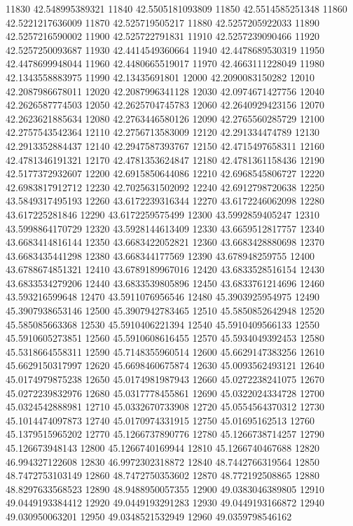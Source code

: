 {11830 42.548995389321
11840 42.5505181093809
11850 42.5514585251348
11860 42.5221217636009
11870 42.525719505217
11880 42.5257205922033
11890 42.5257216590002
11900 42.525722791831
11910 42.5257239090466
11920 42.5257250093687
11930 42.4414549360664
11940 42.4478689530319
11950 42.4478699948044
11960 42.4480665519017
11970 42.4663111228049
11980 42.1343558883975
11990 42.13435691801
12000 42.2090083150282
12010 42.2087986678011
12020 42.2087996341128
12030 42.0974671427756
12040 42.2626587774503
12050 42.2625704745783
12060 42.2640929423156
12070 42.2623621885634
12080 42.2763446580126
12090 42.2765560285729
12100 42.2757543542364
12110 42.2756713583009
12120 42.291334474789
12130 42.2913352884437
12140 42.2947587393767
12150 42.4715497658311
12160 42.4781346191321
12170 42.4781353624847
12180 42.4781361158436
12190 42.5177372932607
12200 42.6915850644086
12210 42.6968545806727
12220 42.6983817912712
12230 42.7025631502092
12240 42.6912798720638
12250 43.5849317495193
12260 43.6172239316344
12270 43.6172246062098
12280 43.617225281846
12290 43.6172259575499
12300 43.5992859405247
12310 43.5998864170729
12320 43.5928144613409
12330 43.6659512817757
12340 43.6683414816144
12350 43.6683422052821
12360 43.6683428880698
12370 43.6683435441298
12380 43.668344177569
12390 43.678948259755
12400 43.6788674851321
12410 43.6789189967016
12420 43.6833528516154
12430 43.6833534279206
12440 43.6833539805896
12450 43.6833761214696
12460 43.593216599648
12470 43.5911076956546
12480 45.3903925954975
12490 45.3907938653146
12500 45.3907942783465
12510 45.5850852642948
12520 45.585085663368
12530 45.5910406221394
12540 45.5910409566133
12550 45.5910605273851
12560 45.5910608616455
12570 45.5934049392453
12580 45.5318664558311
12590 45.7148355960514
12600 45.6629147383256
12610 45.6629150317997
12620 45.6698460675874
12630 45.0093562493121
12640 45.0174979875238
12650 45.0174981987943
12660 45.0272238241075
12670 45.0272239832976
12680 45.0317778455861
12690 45.0322024334728
12700 45.0324542888981
12710 45.0332670733908
12720 45.0554564370312
12730 45.1014474097873
12740 45.0170974331915
12750 45.01695162513
12760 45.1379515965202
12770 45.1266737890776
12780 45.1266738714257
12790 45.126673948143
12800 45.1266740169944
12810 45.1266740467688
12820 46.994327122608
12830 46.9972302318872
12840 48.7442766319564
12850 48.7472753103149
12860 48.7472750353602
12870 48.772192508865
12880 48.8297633568523
12890 48.9488950057355
12900 49.0383046389805
12910 49.0449193384412
12920 49.0449193291283
12930 49.0449193166872
12940 49.030950063201
12950 49.0348521532949
12960 49.0359798546162
}
